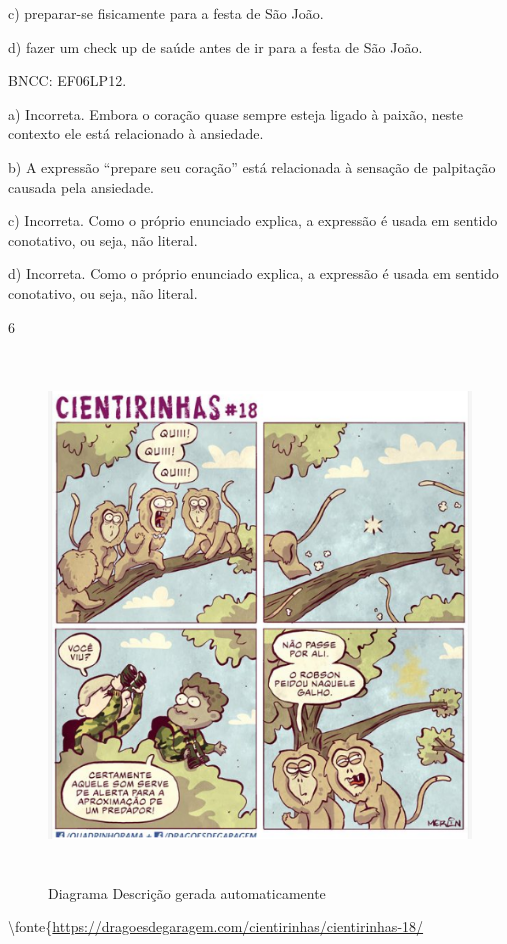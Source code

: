 {c) preparar-se fisicamente para a festa de São João.

d) fazer um check up de saúde antes de ir para a festa de São João.

BNCC: EF06LP12.

a) Incorreta. Embora o coração quase sempre esteja ligado à paixão,
neste contexto ele está relacionado à ansiedade.

b) A expressão ``prepare seu coração'' está relacionada à sensação de
palpitação causada pela ansiedade.

c) Incorreta. Como o próprio enunciado explica, a expressão é usada em
sentido conotativo, ou seja, não literal.

d) Incorreta. Como o próprio enunciado explica, a expressão é usada em
sentido conotativo, ou seja, não literal.

\num{6}

\begin{figure}
\centering
\includegraphics[width=5.19864in,height=5.50077in]{./imgSAEB_6_POR/media/image41.png}
\caption{Diagrama Descrição gerada automaticamente}
\end{figure}

\textbackslash fonte\{\url{https://dragoesdegaragem.com/cientirinhas/cientirinhas-18/}

}
